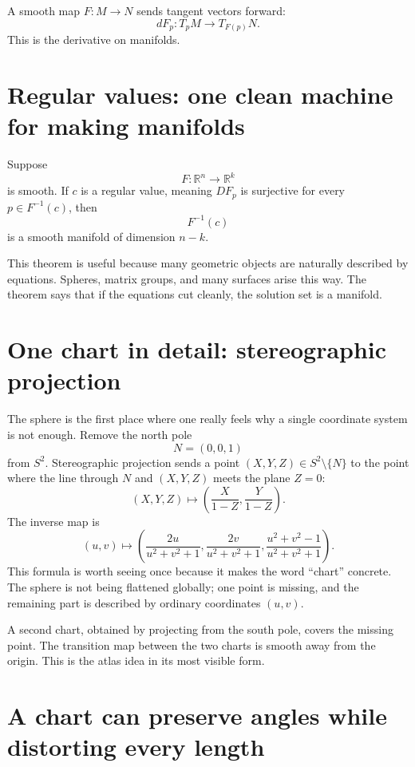 A smooth map \(F:M\to N\) sends tangent vectors forward:
\[
  dF_p:T_pM\to T_{F(p)}N.
\]
This is the derivative on manifolds.

\section{Regular values: one clean machine for making manifolds}

Suppose
\[
  F:\mathbb R^n\to\mathbb R^k
\]
is smooth. If \(c\) is a regular value, meaning \(DF_p\) is surjective for every \(p\in F^{-1}(c)\), then
\[
  F^{-1}(c)
\]
is a smooth manifold of dimension \(n-k\).

This theorem is useful because many geometric objects are naturally described by equations. Spheres, matrix groups, and many surfaces arise this way. The theorem says that if the equations cut cleanly, the solution set is a manifold.


\section{One chart in detail: stereographic projection}

The sphere is the first place where one really feels why a single coordinate system is not enough.  Remove the north pole
\[
  N=(0,0,1)
\]
from \(S^2\).  Stereographic projection sends a point \((X,Y,Z)\in S^2\setminus\{N\}\) to the point where the line through \(N\) and \((X,Y,Z)\) meets the plane \(Z=0\):
\[
  (X,Y,Z)\longmapsto \left(\frac{X}{1-Z},\frac{Y}{1-Z}\right).
\]
The inverse map is
\[
  (u,v)\longmapsto
  \left(
  \frac{2u}{u^2+v^2+1},
  \frac{2v}{u^2+v^2+1},
  \frac{u^2+v^2-1}{u^2+v^2+1}
  \right).
\]
This formula is worth seeing once because it makes the word ``chart'' concrete.  The sphere is not being flattened globally; one point is missing, and the remaining part is described by ordinary coordinates \((u,v)\).

A second chart, obtained by projecting from the south pole, covers the missing point.  The transition map between the two charts is smooth away from the origin.  This is the atlas idea in its most visible form.

\section{A chart can preserve angles while distorting every length}

